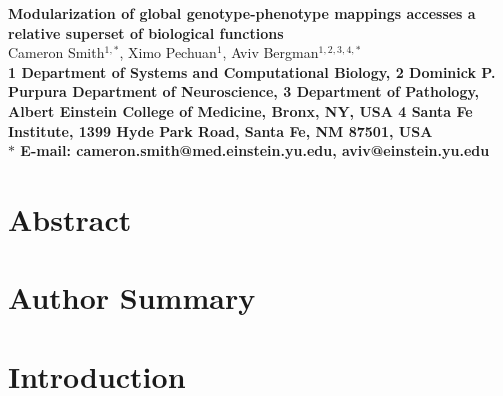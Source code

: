 



\let\ref\autoref

{}
\tableofcontents
\listoffigures
\listoftables
\pagebreak
{}

\begin{flushleft}
{\Large
\textbf{Modularization of global genotype-phenotype mappings accesses a relative superset of biological functions}
}
\\
Cameron Smith$^{1, \ast}$,
Ximo Pechuan$^{1}$,
Aviv Bergman$^{1,2,3,4, \ast}$
\\
\bf{1} Department of Systems and Computational Biology,
\bf{2} Dominick P. Purpura Department of Neuroscience,
\bf{3} Department of Pathology, Albert Einstein College of Medicine, Bronx, NY, USA
\bf{4} Santa Fe Institute, 1399 Hyde Park Road, Santa Fe, NM 87501, USA
\\
$\ast$ E-mail: cameron.smith@med.einstein.yu.edu, aviv@einstein.yu.edu
\end{flushleft}

\section{Abstract}


\section{Author Summary}


\section{Introduction}


